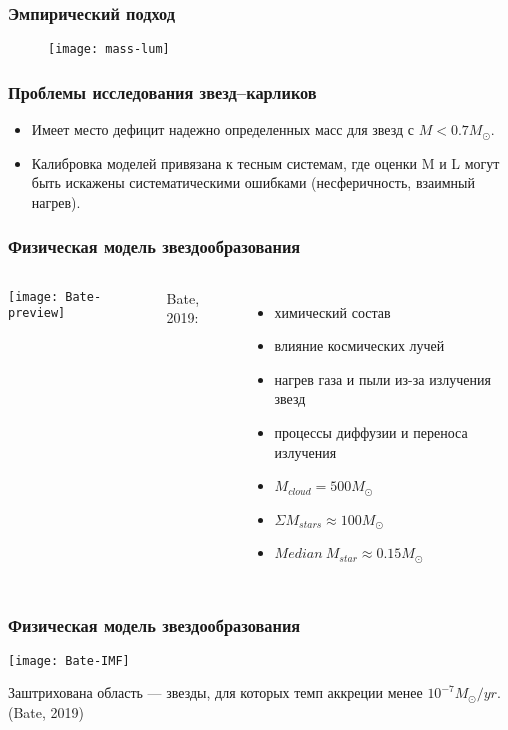 \begin{frame}
\frametitle{Эмпирический подход}
\begin{figure}[pt]
 \centering
 \texttt{[image: mass-lum]}
\end{figure}
\end{frame}

\begin{frame}%
\frametitle{Проблемы исследования звезд--карликов}
\begin{itemize}
\item Имеет место дефицит надежно определенных масс для звезд с $M<0.7 M_{\odot}$.
\item Калибровка моделей привязана к тесным системам, где оценки M и L могут быть искажены систематическими ошибками (несферичность, взаимный нагрев).
\end{itemize}
\end{frame}

\begin{frame}%
\frametitle{Физическая модель звездообразования}
\begin{columns}
	\texttt{[image: Bate-preview]}
{\footnotesize Bate, 2019: \\
\begin{itemize}
   \item химический состав
   \item влияние космических лучей
   \item нагрев газа и пыли из-за излучения звезд
   \item процессы диффузии и переноса излучения
   \item $M_{cloud}=500M_{\odot}$
   \item $\Sigma M_{stars} \approx 100M_\odot$
   \item $Median~M_{star} \approx 0.15M_\odot$
\end{itemize}
}
\end{columns}
\end{frame}

\begin{frame}%
\frametitle{Физическая модель звездообразования}
\begin{center}
\texttt{[image: Bate-IMF]}
\end{center}
{\scriptsize Заштрихована область --- звезды, для которых темп аккреции менее $10^{-7}M_\odot/yr$. (Bate, 2019)}
\end{frame}

